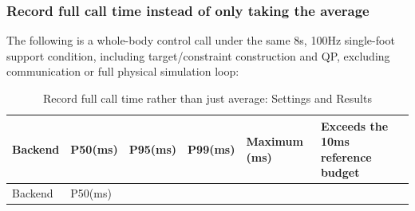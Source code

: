 \subsubsection{Record full call time instead of only taking the average}\label{s27-detail-3}

The following is a whole-body control call under the same 8s, 100Hz single-foot support condition, including target/constraint construction and QP, excluding communication or full physical simulation loop:

\FloatBarrier\begingroup\small\setlength{\tabcolsep}{2.5pt}
\begin{longtable}[]{@{}
  >{\raggedright\arraybackslash}p{}
  >{\raggedright\arraybackslash}p{}
  >{\raggedright\arraybackslash}p{}
  >{\raggedright\arraybackslash}p{}
  >{\raggedright\arraybackslash}p{}
  >{\raggedright\arraybackslash}p{}@{}}
\caption{Record full call time rather than just average: Settings and Results}\label{tab:s27-2}\tabularnewline
\toprule\noalign{}
\begin{minipage}[b]{\linewidth}\raggedright
Backend
\end{minipage} & \begin{minipage}[b]{\linewidth}\raggedright
P50(ms)
\end{minipage} & \begin{minipage}[b]{\linewidth}\raggedright
P95(ms)
\end{minipage} & \begin{minipage}[b]{\linewidth}\raggedright
P99(ms)
\end{minipage} & \begin{minipage}[b]{\linewidth}\raggedright
Maximum (ms)
\end{minipage} & \begin{minipage}[b]{\linewidth}\raggedright
Exceeds the 10ms reference budget
\end{minipage} \\
\midrule\noalign{}
\endfirsthead
\toprule\noalign{}
\begin{minipage}[b]{\linewidth}\raggedright
Backend
\end{minipage} & \begin{minipage}[b]{\linewidth}\raggedright
P50(ms)
\end{minipage} & \begin{minipage}[b]{\linewidth}\raggedright

\end{minipage}
\end{longtable}
